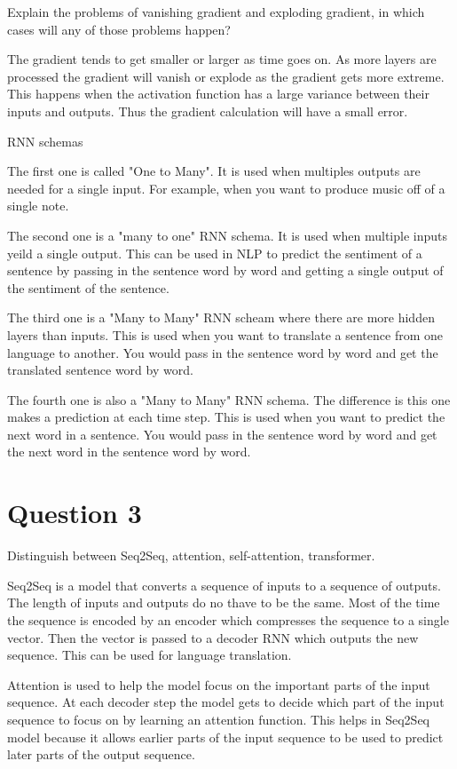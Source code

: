 \documentclass{article}
\begin{document}
Explain the problems of vanishing gradient and exploding gradient, in which cases will any of those problems happen?

The gradient tends to get smaller or larger as time goes on. As more layers are processed the gradient will vanish or explode as the gradient gets more extreme. This happens when the activation function has a large variance between their inputs and outputs. Thus the gradient calculation will have a small error. 



RNN schemas

The first one is called "One to Many". It is used when multiples outputs are needed for a single input. For example, when you want to produce music off of a single note.  

The second one is a "many to one" RNN schema. It is used when multiple inputs yeild a single output. This can be used in NLP to predict the sentiment of a sentence by passing in the sentence word by word and getting a single output of the sentiment of the sentence.

The third one is a "Many to Many" RNN scheam where there are more hidden layers than inputs. This is used when you want to translate a sentence from one language to another. You would pass in the sentence word by word and get the translated sentence word by word.

The fourth one is also a "Many to Many" RNN schema. The difference is this one makes a prediction at each time step. This is used when you want to predict the next word in a sentence. You would pass in the sentence word by word and get the next word in the sentence word by word.

\section{Question 3}

Distinguish between Seq2Seq, attention, self-attention, transformer.

Seq2Seq is a model that converts a sequence of inputs to a sequence of outputs. The length of inputs and outputs do no thave to be the same. Most of the time the sequence is encoded by an encoder which compresses the sequence to a single vector. Then the vector is passed to a decoder RNN which outputs the new sequence. This can be used for language translation. 

Attention is used to help the model focus on the important parts of the input sequence. At each decoder step the model gets to decide which part of the input sequence to focus on by learning an attention function. This helps in Seq2Seq model because it allows earlier parts of the input sequence to be used to predict later parts of the output sequence.
\end{document}
